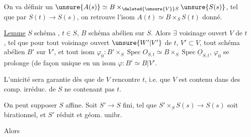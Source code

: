 On va définir un  $\unsure{A(s)}\simeq B\times_{\deleted{\unsure{V}}S}\unsure{S(s)}$, tel que par  $S(t)\longrightarrow S(s)$, on retrouve l'isom $A(t)\simeq B\times_S S(t)$ donné. 

\uline{Lemme} $S$ schéma , \inserted{\deleted{[excellent]}} $t\in S$, $B$ schéma abélien sur $S$. Alors $\exists$ voisinage ouvert $V$ de $t$,  tel que pour  tout voisinage ouvert $\unsure{W'|V'}$ de $t$, $V'\subset V$, tout schéma abélien $B'$ sur $V'$, et tout isom $\varphi_0:B'\times_S\operatorname{Spec}O_{S,t}\simeq B\times_S\operatorname{Spec}\underline O_{S,t}$, $\varphi_0$ se prolonge (de façon unique en un isom $\varphi:B'\simeq B|V'$.

L'unicité sera garantie dès que   de $V$ rencontre $t$, i.e. que $V$ est contenu dans  des comp. irréduc. de $S$ ne contenant pas $t$.

On peut supposer $S$ affine.  Soit $S'\longrightarrow S$ fini, tel que $S'\times_S S(s)\longrightarrow S(s)$ soit birationnel, et $S'$ réduit et géom. unibr.

Alors
